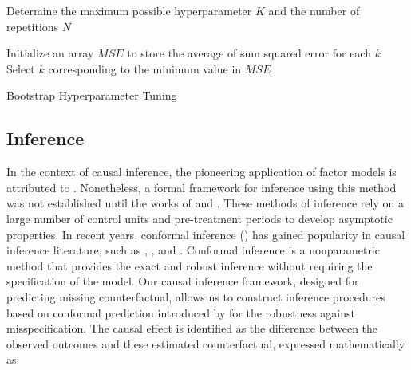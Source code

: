 \documentclass[12pt]{article}
\begin{document}
\begin{algorithm}[!ht]
    \SetAlgoLined
    Determine the maximum possible hyperparameter $K$ and the number of repetitions $N$\;

    Initialize an array $MSE$ to store the average of sum squared error for each $k$\;
    Select $k$ corresponding to the minimum value in $MSE$\;
    \caption{Bootstrap Hyperparameter Tuning}
    \label{algorithm: 1}
\end{algorithm}

\subsection{Inference}

In the context of causal inference, the pioneering application of factor models is attributed to \cite{hsiao2012panel}. Nonetheless, a formal framework for inference using this method was not established until the works of \cite{chan2016policy} and \cite{li2018inference}. These methods of inference rely on a large number of control units and pre-treatment periods to develop asymptotic properties. In recent years, conformal inference (\cite{chernozhukov2021exact}) has gained popularity in causal inference literature, such as \cite{ben2021augmented}, \cite{roth2023s}, and \cite{imbens2024causal}. Conformal inference is a nonparametric method that provides the exact and robust inference without requiring the specification of the model. Our causal inference framework, designed for predicting missing counterfactual, allows us to construct inference procedures based on conformal prediction introduced by \cite{shafer2008tutorial} for the robustness against misspecification. The causal effect is identified as the difference between the observed outcomes and these estimated counterfactual, expressed mathematically as:
\end{document}
